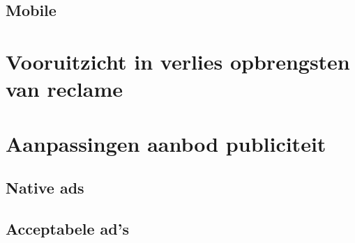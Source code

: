 \documentclass[pdftex,a4paper,12pt,twoside]{report}
\begin{document}
\subsection{Mobile}
\label{sec Mobile}
\section{Vooruitzicht in verlies opbrengsten van reclame}
\label{sec: Vooruitzicht in verlies opbrengsten van reclame}
\section{Aanpassingen aanbod publiciteit}
\label{sec:Aanpassingen aanbod publiciteit}
\subsection{Native ads}
\label{sec Native ads}
\subsection{Acceptabele ad's}
\label{sec Acceptabele ad's}
\end{document}

